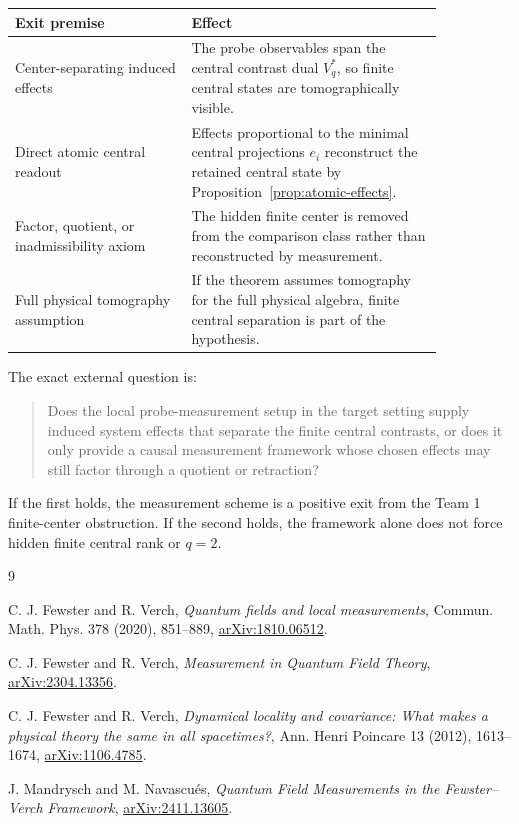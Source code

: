 \documentclass[12pt]{article}
\theoremstyle{remark}
\begin{document}
\begin{center}
\begin{tabular}{p{0.35\linewidth}p{0.50\linewidth}}
\toprule
Exit premise & Effect \\
\midrule
Center-separating induced effects & The probe observables span the central
contrast dual \(V_q^*\), so finite central states are tomographically visible.
\\
\addlinespace
Direct atomic central readout & Effects proportional to the minimal central
projections \(e_i\) reconstruct the retained central state by
Proposition~\ref{prop:atomic-effects}. \\
\addlinespace
Factor, quotient, or inadmissibility axiom & The hidden finite center is
removed from the comparison class rather than reconstructed by measurement. \\
\addlinespace
Full physical tomography assumption & If the theorem assumes tomography for
the full physical algebra, finite central separation is part of the hypothesis.
\\
\bottomrule
\end{tabular}
\end{center}

The exact external question is:

\begin{quote}
Does the local probe-measurement setup in the target setting supply induced
system effects that separate the finite central contrasts, or does it only
provide a causal measurement framework whose chosen effects may still factor
through a quotient or retraction?
\end{quote}

If the first holds, the measurement scheme is a positive exit from the Team 1
finite-center obstruction.  If the second holds, the framework alone does not
force hidden finite central rank or \(q=2\).

\begin{thebibliography}{9}

C. J. Fewster and R. Verch,
\emph{Quantum fields and local measurements},
Commun. Math. Phys. 378 (2020), 851--889,
\href{https://arxiv.org/abs/1810.06512}{arXiv:1810.06512}.

C. J. Fewster and R. Verch,
\emph{Measurement in Quantum Field Theory},
\href{https://arxiv.org/abs/2304.13356}{arXiv:2304.13356}.

C. J. Fewster and R. Verch,
\emph{Dynamical locality and covariance: What makes a physical theory the same in all spacetimes?},
Ann. Henri Poincare 13 (2012), 1613--1674,
\href{https://arxiv.org/abs/1106.4785}{arXiv:1106.4785}.

J. Mandrysch and M. Navascu\'es,
\emph{Quantum Field Measurements in the Fewster--Verch Framework},
\href{https://arxiv.org/abs/2411.13605}{arXiv:2411.13605}.

\end{thebibliography}
\end{document}
